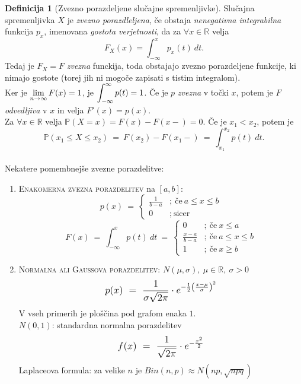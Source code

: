 \documentclass[11pt]{article}
\theoremstyle{definition}
\newtheorem{definicija}{Definicija}[section]
\theoremstyle{definition}
\theoremstyle{definition}
\begin{document}
\begin{definicija}[Zvezno porazdeljene slučajne spremenljivke]

Slučajna spremenljivka $X$ je \textit{zvezno porazdleljena}, če obstaja \textit{nenegativna integrabilna} funkcija $p_x$, imenovana \textit{gostota verjetnosti}, da za $\forall x \in \mathbb{R}$ velja
$$F_X(x) = \int_{-\infty}^x p_x(t) ~dt.$$
Tedaj je $F_X = F$ \textit{zvezna} funckija, toda obstajajo zvezno porazdeljene funkcije, ki nimajo gostote (torej jih ni mogoče zapisati s tistim integralom). \\

\noindent Ker je $\mathlarger{\lim_{n \rightarrow \infty} F(x) = 1}$, je $\mathlarger{\int_{-\infty}^{\infty} p(t) = 1}$. Če je $p$ \textit{zvezna} v točki $x$, potem je $F$ \textit{odvedljiva} v $x$ in velja $F'(x) = p(x)$. \\

\noindent Za $\forall x \in \mathbb{R}$ velja $\mathbb{P}(X = x) = F(x) - F(x-) = 0$. Če je $x_1 < x_2$, potem je 
$$\mathbb{P}(x_1 \leq X \leq x_2) ~=~ F(x_2) - F(x_1-) ~=~ \int_{x_1}^{x_2} p(t) ~dt.$$ \\

\noindent Nekatere pomembnejše zvezne porazdelitve:
\begin{enumerate}
	\item \textsc{Enakomerna zvezna porazdelitev} na $[a, b]$:
	 $$p(x) ~=~ \begin{cases}
	 	\frac{1}{b-a} &; ~\text{če}~ a \leq x \leq b \\
	 	0 &; ~\text{sicer}
	 \end{cases}$$
	 $$F(x) ~=~ \int_{-\infty}^x p(t) ~dt ~=~ \begin{cases}
	 	0 &; ~\text{če}~ x \leq a \\
	 	\frac{x-a}{b-a} &; ~\text{če}~ a \leq x \leq b \\
	 	1 &; ~\text{če}~ x \geq b
	 \end{cases}$$
	 
	\item \textsc{Normalna ali Gaussova porazdelitev}: $N(\mu, \sigma), ~\mu \in \mathbb{R}, ~\sigma > 0$
	$$\mathlarger{p(x)~=~ \frac{1}{\sigma \sqrt{2 \pi}} \cdot e^{-\frac{1}{2} \left( \frac{x-\mu}{\sigma} \right)^2}}$$
V vseh primerih je ploščina pod grafom enaka $1$. \\

$N(0, 1)$: standardna normalna porazdelitev
$$\mathlarger{f(x) ~=~ \frac{1}{\sqrt{2 \pi}} \cdot e^{-\frac{x^2}{2}}}$$
Laplaceova formula: za velike $n$ je $Bin(n, p) \approx N(np, \sqrt{npq})$


\end{enumerate}
\end{definicija}
\end{document}
